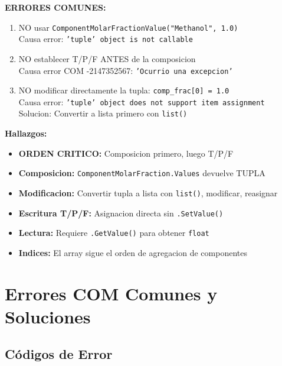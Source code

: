 \documentclass[12pt,a4paper]{article}
\begin{document}
\begin{warningbox}
\textbf{ERRORES COMUNES:}
\begin{enumerate}
    \item NO usar \texttt{ComponentMolarFractionValue("Methanol", 1.0)}
    \\Causa error: \texttt{'tuple' object is not callable}
    \item NO establecer T/P/F ANTES de la composicion
    \\Causa error COM -2147352567: \texttt{'Ocurrio una excepcion'}
    \item NO modificar directamente la tupla: \texttt{comp\_frac[0] = 1.0}
    \\Causa error: \texttt{'tuple' object does not support item assignment}
    \\Solucion: Convertir a lista primero con \texttt{list()}
\end{enumerate}
\end{warningbox}

\begin{infobox}
\textbf{Hallazgos:}
\begin{itemize}
    \item \textbf{ORDEN CRITICO:} Composicion primero, luego T/P/F
    \item \textbf{Composicion:} \texttt{ComponentMolarFraction.Values} devuelve TUPLA
    \item \textbf{Modificacion:} Convertir tupla a lista con \texttt{list()}, modificar, reasignar
    \item \textbf{Escritura T/P/F:} Asignacion directa sin \texttt{.SetValue()}
    \item \textbf{Lectura:} Requiere \texttt{.GetValue()} para obtener \texttt{float}
    \item \textbf{Indices:} El array sigue el orden de agregacion de componentes
\end{itemize}
\end{infobox}

\section{Errores COM Comunes y Soluciones}

\subsection{Códigos de Error}
\end{document}
